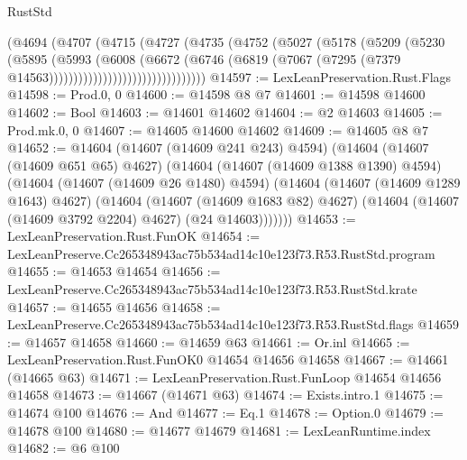 \begin{lexlean}{RustStd}
\begin{coremodule}
                              (@4694
                                (@4707
                                  (@4715
                                    (@4727
                                      (@4735
                                        (@4752
                                          (@5027
                                            (@5178
                                              (@5209
                                                (@5230
                                                  (@5895
                                                    (@5993
                                                      (@6008
                                                        (@6672
                                                          (@6746
                                                            (@6819
                                                              (@7067
                                                                (@7295
                                                                  (@7379
                                                                    @14563))))))))))))))))))))))))))))))))
@14597 := LexLeanPreservation.Rust.Flags
@14598 := Prod.{0, 0}
@14600 := @14598 @8 @7
@14601 := @14598 @14600
@14602 := Bool
@14603 := @14601 @14602
@14604 := @2 @14603
@14605 := Prod.mk.{0, 0}
@14607 := @14605 @14600 @14602
@14609 := @14605 @8 @7
@14652 := @14604
    (@14607 (@14609 @241 @243) @4594)
    (@14604
      (@14607 (@14609 @651 @65) @4627)
      (@14604
        (@14607 (@14609 @1388 @1390) @4594)
        (@14604
          (@14607 (@14609 @26 @1480) @4594)
          (@14604
            (@14607 (@14609 @1289 @1643) @4627)
            (@14604
              (@14607 (@14609 @1683 @82) @4627)
              (@14604 (@14607 (@14609 @3792 @2204) @4627) (@24 @14603)))))))
@14653 := LexLeanPreservation.Rust.FunOK
@14654 := LexLeanPreserve.Cc265348943ac75b534ad14c10e123f73.R53.RustStd.program
@14655 := @14653 @14654
@14656 := LexLeanPreserve.Cc265348943ac75b534ad14c10e123f73.R53.RustStd.krate
@14657 := @14655 @14656
@14658 := LexLeanPreserve.Cc265348943ac75b534ad14c10e123f73.R53.RustStd.flags
@14659 := @14657 @14658
@14660 := @14659 @63
@14661 := Or.inl
@14665 := LexLeanPreservation.Rust.FunOK0 @14654 @14656 @14658
@14667 := @14661 (@14665 @63)
@14671 := LexLeanPreservation.Rust.FunLoop @14654 @14656 @14658
@14673 := @14667 (@14671 @63)
@14674 := Exists.intro.{1}
@14675 := @14674 @100
@14676 := And
@14677 := Eq.{1}
@14678 := Option.{0}
@14679 := @14678 @100
@14680 := @14677 @14679
@14681 := LexLeanRuntime.index
@14682 := @6 @100

\end{coremodule}
\end{lexlean}

